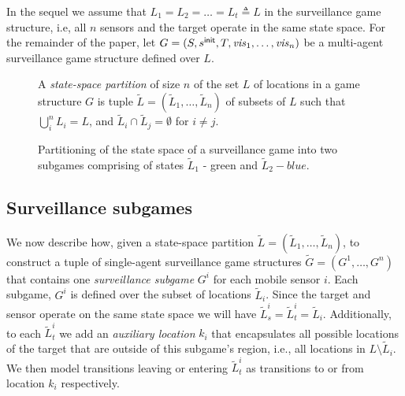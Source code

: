 In the sequel we assume that $L_1 = L_2 = \dots = L_t \triangleq L$  in the surveillance game structure, i.e, all $n$ sensors and the target operate in the same state space. For the remainder of the paper, let $G=(S,s^{\mathsf{init}},T,\mathit{vis}_1,\ldots,\mathit{vis}_n)$ be a multi-agent surveillance game structure  defined over  $L$.

\begin{figure}
A  \emph{state-space partition} of size $n$ of the set $L$ of locations in a game structure $G$ is tuple $\widetilde L =  (\widetilde L_1,\ldots,\widetilde L_n)$ of subsets of $L$ such that  $\bigcup_i^n L_i = L $, and $\widetilde L_i \cap \widetilde L_j  = \emptyset$ for $i \neq j$. 

{}


\caption{Partitioning of the state space of a surveillance game into two subgames comprising of states $\widetilde{L}_1$ - green and $\widetilde{L}_2 - blue$. }
\label{fig:simple-dist-game}
\end{figure}

\subsection{Surveillance subgames}
We now describe how, given a state-space partition $\widetilde L =  (\widetilde L_1,\ldots,\widetilde L_n)$, to construct a tuple of single-agent surveillance game structures $\widetilde G = (G^1,\ldots,G^n)$ that contains one  \emph{surveillance subgame} $G^i$ for each mobile sensor  $i$. Each subgame, $G^i$ is defined over the subset of locations $\widetilde{L}_i$. Since the target and sensor operate on the same state space we will have $\widetilde{L}^i_s = \widetilde{L}^i_t = \widetilde{L}_i$. Additionally, to each $\widetilde{L}^i_t$ we add an \emph{auxiliary location} $k_i$ that encapsulates all possible locations of the target that are outside of this subgame's region, i.e., all locations in $L \setminus \widetilde{L}_i$.  We then model transitions leaving or entering $\widetilde{L}^i_t$ as transitions to or from location $k_i$ respectively.

